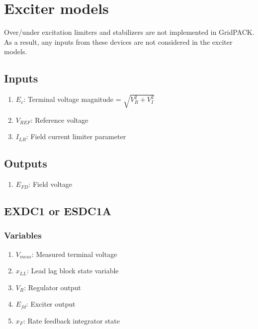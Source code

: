 \documentclass[12pt]{article}
\newcommand{\Vref}{V_{REF}}
\begin{document}
\section{Exciter models}
Over/under excitation limiters and stabilizers are not implemented in GridPACK. As a result, any inputs from these devices are not considered in the exciter models.

\subsection{Inputs}
\begin{enumerate}
  \item $E_c$: Terminal voltage magnitude = $\sqrt{V^{2}_R + V^{2}_I}$
  \item $\Vref$: Reference voltage
  \item $I_{LR}$: Field current limiter parameter
\end{enumerate}

\subsection{Outputs}
\begin{enumerate}
  \item $E_{FD}$: Field voltage
\end{enumerate}

\subsection{EXDC1 or ESDC1A \cite{PSSE}}

\subsubsection{Variables}
\begin{enumerate}
  \item $V_{meas}$: Measured terminal voltage
  \item $x_{LL}$: Lead lag block state variable
  \item $V_{R}$: Regulator output
  \item $E_{fd}$: Exciter output
  \item $x_F$: Rate feedback integrator state
\end{enumerate}
\end{document}

